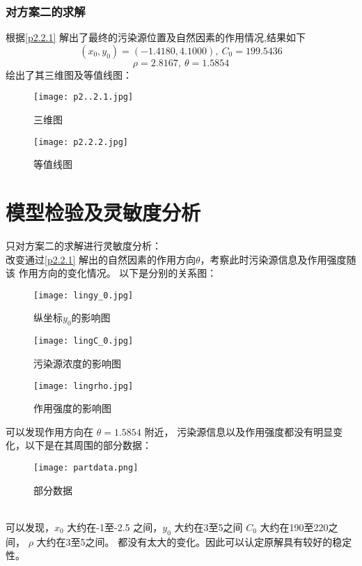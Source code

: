\documentclass[UTF8]{ctexart}
\begin{document}
     \subsubsection{对方案二的求解}  
     根据\ref{p2.2.1}  解出了最终的污染源位置及自然因素的作用情况,结果如下
 $$
  (x_0,y_0)=(-1.4180,4.1000), \ C_0=199.5436 $$
$$ \rho=  2.8167,\ \theta=  1.5854 $$
绘出了其三维图及等值线图：
\begin{figure}[htbp]
  \centering
  
          \texttt{[image: p2..2.1.jpg]}
          \caption{三维图}
          \label{pp2.1}
 \end{figure}
\begin{figure}
  
        \centering
        \texttt{[image: p2.2.2.jpg]}
        \caption{等值线图}
        \label{pp2.2}
  
      
 \end{figure}
\newpage
\section{模型检验及灵敏度分析}
只对方案二的求解进行灵敏度分析：\\
改变通过\ref{p2.2.1} 解出的自然因素的作用方向$\theta$，考察此时污染源信息及作用强度随该
作用方向的变化情况。
以下是分别的关系图：
\begin{figure}[htbp] %
  \centering
  {
      \begin{minipage}[t]{0.4\linewidth}
          \centering
          \texttt{[image: lingy\_0.jpg]}
          \caption{纵坐标$y_0$的影响图}
          \label{1(2)}
      \end{minipage}
  }
  {
      \begin{minipage}[t]{0.4\linewidth}
          \centering
          \texttt{[image: lingC\_0.jpg]}
          \caption{污染源浓度的影响图}
          \label{2(1)f}
      \end{minipage}
  }
  {
      \begin{minipage}[t]{0.4\linewidth}
          \centering
          \texttt{[image: lingrho.jpg]}
          \caption{作用强度的影响图}
          \label{2(1)c}
      \end{minipage}
  }
    \end{figure}
    \newpage
    可以发现作用方向在 $\theta=1.5854$ 附近，
    污染源信息以及作用强度都没有明显变化，以下是在其周围的部分数据：\\
    \begin{figure}[htbp]
      \centering
      \texttt{[image: partdata.png]}
      \caption{部分数据}
      \label{fig:partdata}
    \end{figure}
    \\
    可以发现，$x_0$ 大约在-1至-2.5 之间，$y_0$ 大约在3至5之间
    $C_0$ 大约在190至220之间， $\rho$ 大约在3至5之间。
    都没有太大的变化。因此可以认定原解具有较好的稳定性。
\end{document}
